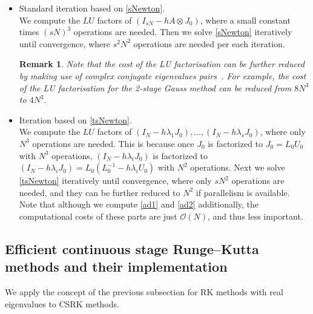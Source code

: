 \documentclass[final,leqno,onefignum,onetabnum]{siamltex1213}
\newtheorem{remark}{Remark}
\begin{document}
\begin{itemize}
\item Standard iteration based on \eqref{sNewton}.\\
We compute the $LU$ factors of $(I_{sN}-hA\otimes J_0)$,
where a small constant times $(sN)^3$ operations are needed.
Then we solve \eqref{sNewton} iteratively until convergence,
where $s^2N^2$ operations are needed per each iteration.
\begin{remark}
Note that the cost of the LU factorisation can be further reduced
by making use of complex conjugate eigenvalues pairs~\cite{hw96ii}.
For example, the cost of the LU factorisation for the 2-stage Gauss method
can be reduced from $8N^3$ to $4N^3$.
\end{remark}
\item Iteration based on \eqref{tsNewton}.\\
We compute the $LU$ factors of $(I_{N}-h\lambda_1 J_0),\dots,
(I_{N}-h\lambda_s J_0)$,
where only $N^3$ operations are needed.
This is because once $J_0$ is factorized to $J_0=L_0U_0$ with $N^3$ operations,
$(I_{N}-h\lambda_i J_0)$ is factorized to
$(I_{N}-h\lambda_i J_0) = L_0 (L_0^{-1}-h\lambda_iU_0)$
with $N^2$ operations.
Next we solve \eqref{tsNewton} iteratively until convergence,
where only $sN^2$ operations are needed,
and they can be further reduced to $N^2$ if parallelism is available.
Note that although we compute  \eqref{ad1} and \eqref{ad2} additionally,
the computational costs of these parts are just $\mathcal{O}(N)$, and thus less important.
\end{itemize}

\subsection{Efficient continuous stage Runge--Kutta methods and their implementation}
We apply the concept of the previous subsection for RK methods with real eigenvalues to CSRK methods.
\end{document}
